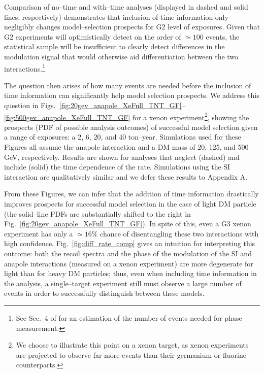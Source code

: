 \documentclass[11pt, a4paper]{article}
\newcommand{\Fig}[1]{Fig.~\ref{#1}} \newcommand{\Figs}[2]{Figs.~\ref{#1} and \ref{#2}}
\begin{document}
Comparison of no--time and with--time analyses (displayed in dashed and solid lines, respectively) demonstrates that inclusion of time information only negligibly changes model--selection prospects for G2 level of exposures. Given that G2 experiments will optimistically detect on the order of $\simeq 100$ events, the statistical sample will be insufficient to clearly detect differences in the modulation signal that would otherwise aid differentiation between the two interactions.\footnote{See Sec.~4 of \cite{DelNobile:2015nua} for an estimation of the number of events needed for phase measurement. }

The question then arises of how many events are needed before the inclusion of time information can significantly help model selection prospects. We address this question in Figs.~\ref{fig:20gev_anapole_XeFull_TNT_GF}--\ref{fig:500gev_anapole_XeFull_TNT_GF} for a xenon experiment\footnote{We choose to illustrate this point on a xenon target, as xenon experiments are projected to observe far more events than their germanium or fluorine counterparts.}, showing the prospects (PDF of possible analysis outcomes) of successful model selection given a range of exposures: a 2, 6, 20, and 40 ton--year. Simulations used for these Figures all assume the anapole interaction and a DM mass of 20, 125, and 500 GeV, respectively. Results are shown for analyses that neglect (dashed) and include (solid) the time dependence of the rate. Simulations using the SI interaction are qualitatively similar and we defer these results to Appendix A.

From these Figures, we can infer that the addition of time information drastically improves prospects for successful model selection in the case of light DM particle (the solid--line PDFs are substantially shifted to the right in \Fig{fig:20gev_anapole_XeFull_TNT_GF}). In spite of this, even a G3 xenon experiment has only a $\simeq 16\%$ chance of disentangling these two interactions with high confidence. \Fig{fig:diff_rate_comp} gives an intuition for interpreting this outcome: both the recoil spectra and the phase of the modulation of the SI and anapole interactions (measured on a xenon experiment) are more degenerate for light than for heavy DM particles; thus, even when including time information in the analysis, a single--target experiment still must observe a large number of events in order to successfully distinguish between these models.
\end{document}
